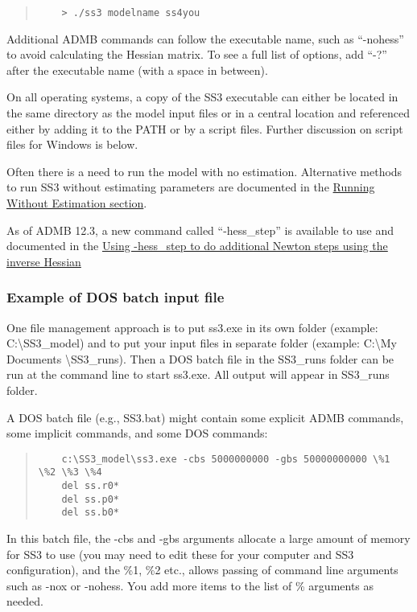 \begin{quote}
	\begin{verbatim}
	> ./ss3 modelname ss4you
	\end{verbatim}
\end{quote}

Additional ADMB commands can follow the executable name, such as ``-nohess'' to avoid calculating the Hessian matrix. To see a full list of options, add ``-?'' after the executable name (with a space in between).

On all operating systems, a copy of the SS3 executable can either be located in the same directory as the model input files or in a central location and referenced either by adding it to the PATH or by a script files. Further discussion on script files for Windows is below.

Often there is a need to run the model with no estimation. Alternative methods to run SS3 without estimating parameters are documented in the \hyperlink{NoEst}{Running Without Estimation section}. 

As of ADMB 12.3, a new command called ``-hess\_step'' is available to use and documented in the \hyperlink{hess-step}{Using -hess\_step to do additional Newton steps using the inverse Hessian}

\subsubsection{Example of DOS batch input file}
One file management approach is to put ss3.exe in its own folder (example:  C:\textbackslash SS3\_model) and to put your input files in separate folder (example:  C:\textbackslash My Documents \textbackslash SS3\_runs). Then a DOS batch file in the SS3\_runs folder can be run at the command line to start ss3.exe.  All output will appear in SS3\_runs folder.

A DOS batch file (e.g., SS3.bat) might contain some explicit ADMB commands, some implicit commands, and some DOS commands:

\begin{quote}
	\begin{verbatim}
	c:\SS3_model\ss3.exe -cbs 5000000000 -gbs 50000000000 \%1 \%2 \%3 \%4 
	del ss.r0*
	del ss.p0*
	del ss.b0*
	\end{verbatim}
\end{quote}


In this batch file, the -cbs and -gbs arguments allocate a large amount of memory for SS3 to use (you may need to edit these for your computer and SS3 configuration), and the \%1, \%2 etc., allows passing of command line arguments such as -nox or -nohess. You add more items to the list of \% arguments as needed.


